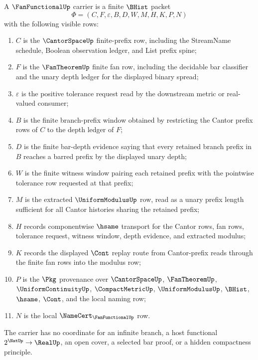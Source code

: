 \begin{definition}
\label{def:fan-functional-carrier-surface}
A $\FanFunctionalUp$ carrier is a finite $\BHist$ packet
$$
\Phi=(C,F,\varepsilon,B,D,W,M,H,K,P,N)
$$
with the following visible rows:
\begin{enumerate}
\item $C$ is the $\CantorSpaceUp$ finite-prefix row, including the
StreamName schedule, Boolean observation ledger, and List prefix spine;
\item $F$ is the $\FanTheoremUp$ finite fan row, including the decidable bar
classifier and the unary depth ledger for the displayed binary spread;
\item $\varepsilon$ is the positive tolerance request read by the downstream
metric or real-valued consumer;
\item $B$ is the finite branch-prefix window obtained by restricting the
Cantor prefix rows of $C$ to the depth ledger of $F$;
\item $D$ is the finite bar-depth evidence saying that every retained branch
prefix in $B$ reaches a barred prefix by the displayed unary depth;
\item $W$ is the finite witness window pairing each retained prefix with the
pointwise tolerance row requested at that prefix;
\item $M$ is the extracted $\UniformModulusUp$ row, read as a unary prefix
length sufficient for all Cantor histories sharing the retained prefix;
\item $H$ records componentwise $\hsame$ transport for the Cantor rows, fan
rows, tolerance request, witness window, depth evidence, and extracted modulus;
\item $K$ records the displayed $\Cont$ replay route from Cantor-prefix reads
through the finite fan rows into the modulus row;
\item $P$ is the $\Pkg$ provenance over $\CantorSpaceUp$, $\FanTheoremUp$,
$\UniformContinuityUp$, $\CompactMetricUp$, $\UniformModulusUp$, $\BHist$,
$\hsame$, $\Cont$, and the local naming row;
\item $N$ is the local $\NameCert_{\FanFunctionalUp}$ row.
\end{enumerate}
The carrier has no coordinate for an infinite branch, a host functional
$2^{\NatUp}\to\RealUp$, an open cover, a selected bar proof, or a hidden
compactness principle.
\end{definition}

